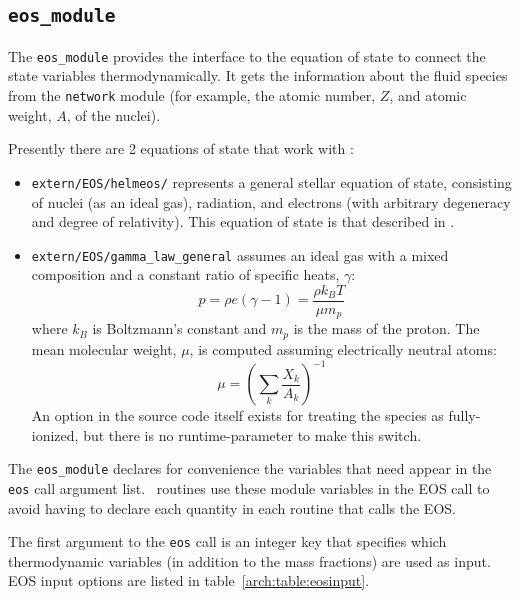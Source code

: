 \subsection{{\tt eos\_module}}

The {\tt eos\_module} provides the interface to the equation of 
state to connect the state variables thermodynamically.  It 
gets the information about the fluid species from the {\tt network}
module (for example, the atomic number, $Z$, and atomic weight, $A$,
of the nuclei).

Presently there are 2 equations of state that work with \maestro:
\begin{itemize}
\item {\tt extern/EOS/helmeos/} represents a general stellar equation 
      of state, consisting of nuclei (as an ideal gas), radiation,
      and electrons (with arbitrary degeneracy and degree of relativity).
      This equation of state is that described in \cite{timmes_eos}.

\item {\tt extern/EOS/gamma\_law\_general} assumes an ideal gas with a mixed 
     composition and a constant ratio of specific heats, $\gamma$:
      \begin{equation}
      p = \rho e (\gamma - 1) = \frac{\rho k_B T}{\mu m_p} 
      \end{equation}
     where $k_B$ is Boltzmann's constant and $m_p$ is the mass of the
     proton.
     The mean molecular weight, $\mu$, is computed assuming 
     electrically neutral atoms:
     \begin{equation}
     \mu = \left ( \sum_k \frac{X_k}{A_k} \right )^{-1}
     \end{equation}
     An option in the source code itself exists for treating the
     species as fully-ionized, but there is no runtime-parameter to
     make this switch.
\end{itemize}

The {\tt eos\_module} declares for convenience the variables that need
appear in the {\tt eos} call argument list.  \maestro\ routines use
these module variables in the EOS call to avoid having to declare 
each quantity in each routine that calls the EOS.

The first argument to the {\tt eos} call is an integer key that
specifies which thermodynamic variables (in addition to the mass
fractions) are used as input.  EOS input options are listed 
in table~\ref{arch:table:eosinput}.

